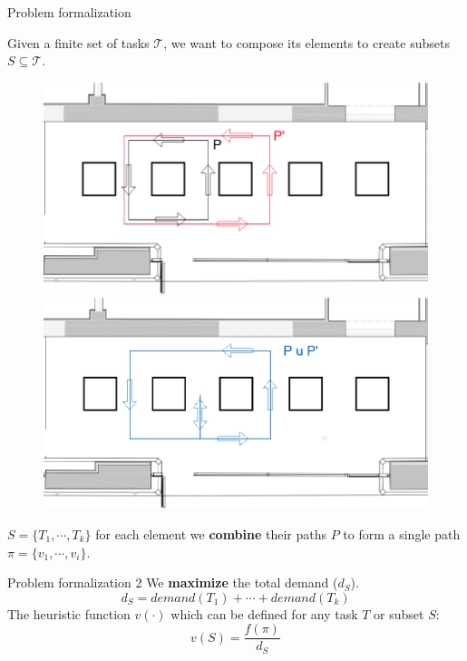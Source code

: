     \begin{frame}[fragile]{Problem formalization}
        
        Given a finite set of tasks $\mathcal{T}$, we want to compose its elements to 
        create subsets $S\subseteq\mathcal{T}$.

        \begin{figure}
            
            \includegraphics[scale=0.18]{img/p1p2_cut.png}
            \includegraphics[scale=0.18]{img/p3_cut.png}
            
        \end{figure}
        $S = \{T_1,\cdots,T_k\}$ for each element we {\bf combine} their paths $P$ to form
        a single path $\pi = \{v_1,\cdots,v_i\}$.
    \end{frame}

    \begin{frame}[fragile]{Problem formalization 2}
       We {\bf maximize} the total demand ($d_S$).
        \[d_S =demand(T_1) + \cdots + demand(T_k)\]
        The heuristic function $v(\cdot)$ which
        can be defined for any task $T$ or subset $S$:
        \[ v(S) = \frac{f(\pi)}{d_S}\]
    \end{frame}

